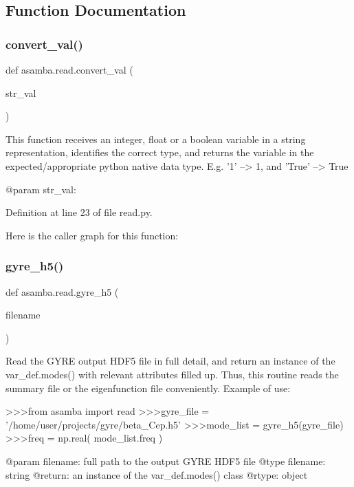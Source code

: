 \subsection{Function Documentation}
\mbox{\label{namespaceasamba_1_1read_ace4b0a61b1709d8ed716d72ee1970116}} 
\subsubsection{\texorpdfstring{convert\+\_\+val()}{convert\_val()}}
{\footnotesize\ttfamily def asamba.\+read.\+convert\+\_\+val (\begin{DoxyParamCaption}\item[{}]{str\+\_\+val }\end{DoxyParamCaption})}

\begin{DoxyVerb}This function receives an integer, float or a boolean variable in a string representation, identifies
the correct type, and returns the variable in the expected/appropriate python native data type. 
E.g. '1' --> 1, and 'True' --> True

@param str_val: 
\end{DoxyVerb}
 

Definition at line 23 of file read.\+py.

Here is the caller graph for this function\+:
\mbox{\label{namespaceasamba_1_1read_a9d452d521d54c77714542bea2e6e93fa}} 
\subsubsection{\texorpdfstring{gyre\+\_\+h5()}{gyre\_h5()}}
{\footnotesize\ttfamily def asamba.\+read.\+gyre\+\_\+h5 (\begin{DoxyParamCaption}\item[{}]{filename }\end{DoxyParamCaption})}

\begin{DoxyVerb}Read the GYRE output HDF5 file in full detail, and return an instance of the var_def.modes() with
relevant attributes filled up. Thus, this routine reads the summary file or the eigenfunction file
conveniently. Example of use:

>>>from asamba import read
>>>gyre_file = '/home/user/projects/gyre/beta_Cep.h5'
>>>mode_list = gyre_h5(gyre_file)
>>>freq      = np.real( mode_list.freq )

@param filename: full path to the output GYRE HDF5 file
@type filename: string
@return: an instance of the var_def.modes() class
@rtype: object
\end{DoxyVerb}
 

